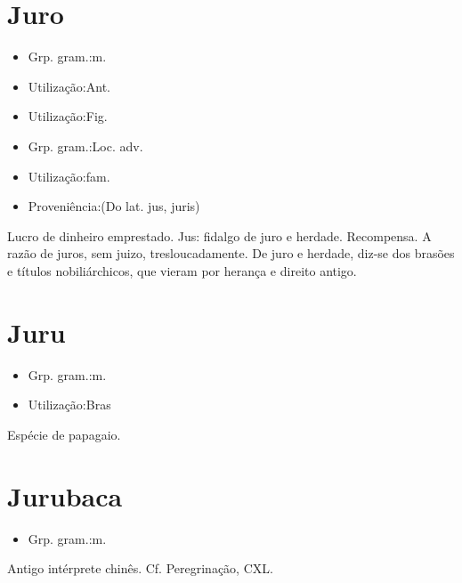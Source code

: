 \documentclass{article}
\begin{document}
\section{Juro}
\begin{itemize}
\item {Grp. gram.:m.}
\end{itemize}
\begin{itemize}
\item {Utilização:Ant.}
\end{itemize}
\begin{itemize}
\item {Utilização:Fig.}
\end{itemize}
\begin{itemize}
\item {Grp. gram.:Loc. adv.}
\end{itemize}
\begin{itemize}
\item {Utilização:fam.}
\end{itemize}
\begin{itemize}
\item {Proveniência:(Do lat. \textunderscore jus\textunderscore , \textunderscore juris\textunderscore )}
\end{itemize}
Lucro de dinheiro emprestado.
Jus: \textunderscore fidalgo de juro e herdade\textunderscore .
Recompensa.
\textunderscore A razão de juros\textunderscore , sem juizo, tresloucadamente.
\textunderscore De juro e herdade\textunderscore , diz-se dos brasões e títulos nobiliárchicos, que vieram por herança e direito antigo.
\section{Juru}
\begin{itemize}
\item {Grp. gram.:m.}
\end{itemize}
\begin{itemize}
\item {Utilização:Bras}
\end{itemize}
Espécie de papagaio.
\section{Jurubaca}
\begin{itemize}
\item {Grp. gram.:m.}
\end{itemize}
Antigo intérprete chinês. Cf. \textunderscore Peregrinação\textunderscore , CXL.
\end{document}
